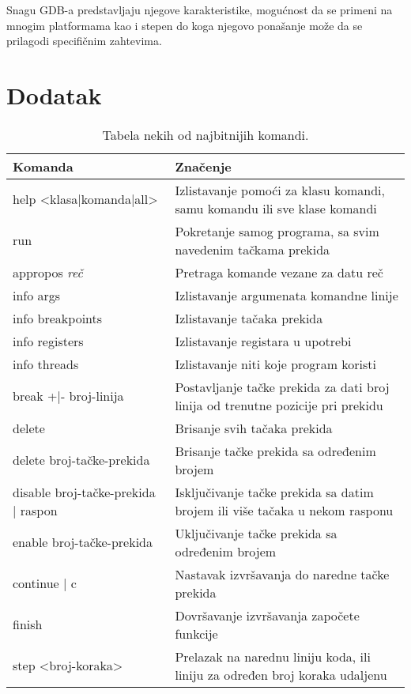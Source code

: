 \documentclass[a4paper]{article}
\begin{document}
Snagu GDB-a predstavljaju njegove karakteristike, mogućnost da se primeni na mnogim platformama kao i
stepen do koga njegovo ponašanje može da se prilagodi specifičnim zahtevima\cite{gnu}.  


\appendix
 


\section{Dodatak}
\label{dodatak}

\begin{table}[H]
\begin{center}
\caption{Tabela nekih od najbitnijih komandi.}
\begin{tabular}{|p{4cm}|p{6cm}|} \hline
Komanda & Značenje\\ \hline
help <klasa|komanda|all> & Izlistavanje pomoći za klasu komandi, samu komandu ili sve klase komandi\\ \hline
run & Pokretanje samog programa, sa svim navedenim tačkama prekida \\ \hline
appropos \textit{reč} & Pretraga komande vezane za datu reč\\ \hline
info args & Izlistavanje argumenata komandne linije \\ \hline
info breakpoints & Izlistavanje tačaka prekida \\ \hline
info registers & Izlistavanje registara u upotrebi \\ \hline
info threads & Izlistavanje niti koje program koristi \\ \hline
break +|- broj-linija & Postavljanje tačke prekida za dati broj linija od trenutne pozicije pri prekidu \\ \hline
delete & Brisanje svih tačaka prekida \\ \hline
delete broj-tačke-prekida & Brisanje tačke prekida sa određenim brojem \\ \hline
disable broj-tačke-prekida | raspon & Isključivanje tačke prekida sa datim brojem ili više tačaka u nekom rasponu \\ \hline
enable broj-tačke-prekida & Uključivanje tačke prekida sa određenim brojem \\ \hline
continue | c & Nastavak izvršavanja do naredne tačke prekida \\ \hline
finish & Dovršavanje izvršavanja započete funkcije \\ \hline
step <broj-koraka> & Prelazak na narednu liniju koda, ili liniju za određen broj koraka udaljenu \\ \hline

\end{tabular}
\end{center}
\end{table}
\end{document}
